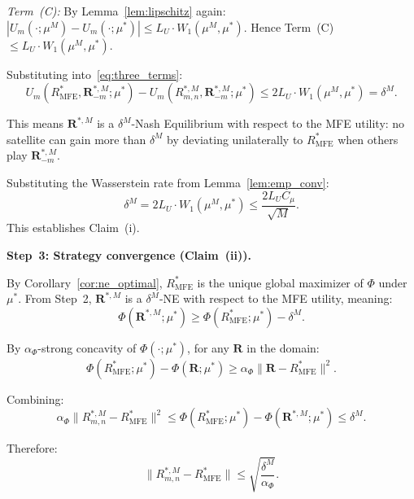 \documentclass[journal]{IEEEtran}
\newcommand{\bfR}{\mathbf{R}}
\begin{document}
\begin{IEEEproof}
\emph{Term~(C):}
By Lemma~\ref{lem:lipschitz} again: $|U_m(\cdot;\mu^M) - U_m(\cdot;\mu^*)|
\leq L_U \cdot W_1(\mu^M, \mu^*)$.
Hence Term~(C) $\leq L_U \cdot W_1(\mu^M, \mu^*)$.

Substituting into~\eqref{eq:three_terms}:
\begin{equation}
    U_m(R_{\mathrm{MFE}}^*,
    \bfR_{-m}^{*,M}; \mu^*)
    - U_m(R_{m,n}^{*,M},
    \bfR_{-m}^{*,M}; \mu^*)
    \leq 2 L_U \cdot W_1(\mu^M, \mu^*)
    = \delta^M.
    \label{eq:delta_M_bound}
\end{equation}

This means $\bfR^{*,M}$ is a $\delta^M$-Nash Equilibrium with respect to the MFE utility: no satellite can gain more than $\delta^M$ by deviating unilaterally to $R_{\mathrm{MFE}}^*$ when others play $\bfR_{-m}^{*,M}$.

Substituting the Wasserstein rate from Lemma~\ref{lem:emp_conv}:
\begin{equation}
    \delta^M
    = 2L_U \cdot W_1(\mu^M, \mu^*)
    \leq \frac{2L_U C_\mu}{\sqrt{M}}.
\end{equation}
This establishes Claim~(i).

\smallskip
\noindent\textbf{Step~3: Strategy convergence
(Claim~(ii)).}

By Corollary~\ref{cor:ne_optimal}, $R_{\mathrm{MFE}}^*$ is the unique global maximizer of $\Phi$ under $\mu^*$. From Step~2, $\bfR^{*,M}$ is a $\delta^M$-NE with respect to the MFE utility, meaning:
\begin{equation}
    \Phi(\bfR^{*,M}; \mu^*)
    \geq \Phi(R_{\mathrm{MFE}}^*; \mu^*)
    - \delta^M.
\end{equation}

By $\alpha_\Phi$-strong concavity of $\Phi(\cdot; \mu^*)$, for any $\bfR$ in the domain:
\begin{equation}
    \Phi(R_{\mathrm{MFE}}^*; \mu^*)
    - \Phi(\bfR; \mu^*)
    \geq
    \alpha_\Phi \|{\bfR} - R_{\mathrm{MFE}}^*\|^2.
\end{equation}

Combining:
\begin{equation}
    \alpha_\Phi
    \|R_{m,n}^{*,M} - R_{\mathrm{MFE}}^*\|^2
    \leq
    \Phi(R_{\mathrm{MFE}}^*; \mu^*)
    - \Phi(\bfR^{*,M}; \mu^*)
    \leq \delta^M.
\end{equation}

Therefore:
\begin{equation}
    \|R_{m,n}^{*,M} - R_{\mathrm{MFE}}^*\|
    \leq \sqrt{\frac{\delta^M}{\alpha_\Phi}}.
    \label{eq:strategy_rate}
\end{equation}


\end{IEEEproof}
\end{document}
